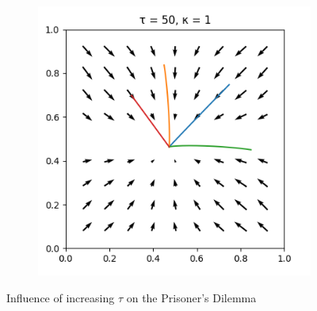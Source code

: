 \documentclass[10pt,a4paper]{article}
\begin{document}
\begin{figure}[h]
\begin{subfigure}[b]{0.30\textwidth}
    \end{subfigure}
    \begin{subfigure}[b]{0.30\textwidth}
        \includegraphics[width=\textwidth]{Figures/boltzmann_pd_temp50.png}
    \end{subfigure}
    \caption{Influence of increasing $\tau$ on the Prisoner's Dilemma}\label{fig:tau}
\end{figure}




{}

\end{document}
